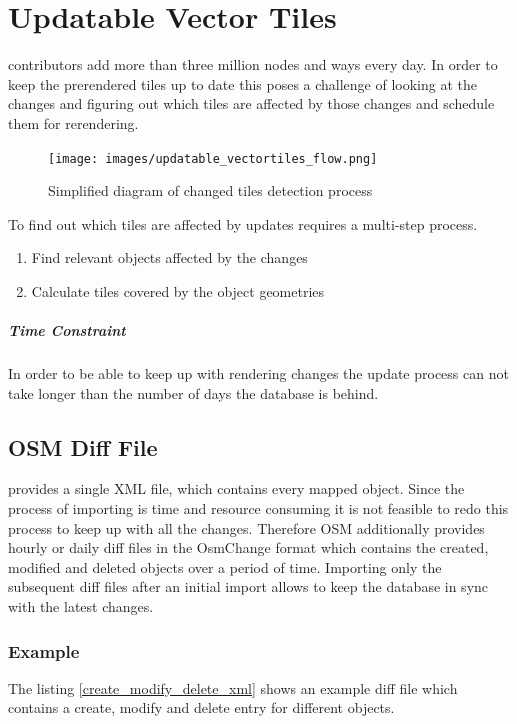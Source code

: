 \chapter{Updatable Vector Tiles}\label{chapter_updatable_vector_tiles}


\osm{} contributors add more than three million nodes and ways every day.
In order to keep the prerendered tiles up to date this poses a challenge of looking at the changes
and figuring out which tiles are affected by those changes and schedule them for rerendering.

\begin{figure}[H]
  \centering
  \texttt{[image: images/updatable\_vectortiles\_flow.png]}
  \caption{Simplified diagram of changed tiles detection process}
\end{figure}

To find out which tiles are affected by updates requires a multi-step process.

\begin{enumerate}
    \item Find relevant \osm{} objects affected by the changes
    \item Calculate tiles covered by the object geometries
\end{enumerate}

\paragraph{Time Constraint} In order to be able to keep up with rendering changes the update process can not take longer than the number of days the database is behind.

\section{OSM Diff File}

\osm{} provides a single XML file, which contains every mapped object. Since the process of importing is time and resource consuming it is not feasible to redo this process to keep up with all the changes. Therefore OSM additionally provides hourly or daily diff files in the OsmChange format which contains the created, modified and deleted objects over a period of time. Importing only the subsequent diff files after an initial import allows to keep the database in sync with the latest changes.

\subsection*{Example}
The listing \autoref{create_modify_delete_xml} shows an example diff file which contains a create, modify and delete entry for different objects.

